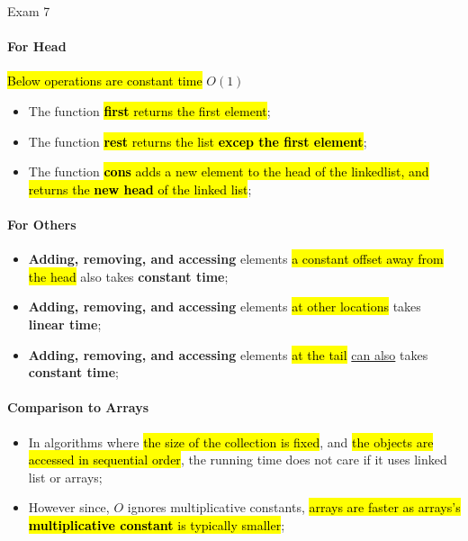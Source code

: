 \documentclass{note}
\begin{document}
\begin{note}{Exam 7}
        \paragraph{For Head}

        \hl{Below operations are constant time} $ O \left( 1 \right) $

        \begin{itemize}
            \item The function \hl{\textbf{first} returns the first element};
            \item The function \hl{\textbf{rest} returns the list \textbf{excep the first element}};
            \item The function \hl{\textbf{cons} adds a new element to the head of the linkedlist, and returns
            the \textbf{new head} of the linked list};
        \end{itemize}

        \paragraph{For Others}

        \begin{itemize}
            \item \textbf{Adding, removing, and accessing} elements \hl{a constant offset away from the head} also takes
            \textbf{constant time};
            \item \textbf{Adding, removing, and accessing} elements \hl{at other locations} takes
            \textbf{linear time};
            \item \textbf{Adding, removing, and accessing} elements \hl{at the tail} \ul{can also} takes
            \textbf{constant time};
        \end{itemize}

        \paragraph{Comparison to Arrays}

        \begin{itemize}
            \item In algorithms where \hl{the size of the collection is fixed}, and \hl{the objects are accessed in sequential order},
            the running time does not care if it uses linked list or arrays;
            \item However since, $ O $ ignores multiplicative constants, \hl{arrays are faster as arrays's \textbf{multiplicative constant}
            is typically smaller};
        \end{itemize}


\end{note}
\end{document}
